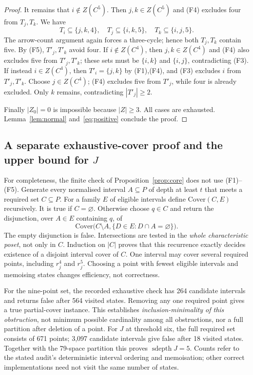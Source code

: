 \documentclass[11pt,a4paper]{article}
\theoremstyle{remark}\newtheorem{remark}[theorem]{Remark}
\DeclareMathOperator{\sdepth}{sdepth}
\begin{document}
\begin{proof}
It remains that $i\notin Z(C^5)$. Then $j,k\in Z(C^5)$ and (F4) excludes four from $T_j,T_k$. We have
\[
T_i\subseteq\{j,k,4\},\quad T_j\subseteq\{i,k,5\},\quad T_k\subseteq\{i,j,5\}.
\]
The arrow-count argument again forces a three-cycle; hence both $T_j,T_k$ contain five. By (F5), $T'_j,T'_k$ avoid four. If $i\notin Z(C^4)$, then $j,k\in Z(C^4)$ and (F4) also excludes five from $T'_j,T'_k$; these sets must be $\{i,k\}$ and $\{i,j\}$, contradicting (F3). If instead $i\in Z(C^4)$, then $T'_i=\{j,k\}$ by (F1),(F4), and (F3) excludes $i$ from $T'_j,T'_k$. Choose $j\in Z(C^4)$; (F4) excludes five from $T'_j$, while four is already excluded. Only $k$ remains, contradicting $|T'_j|\ge2$.

Finally $|Z_0|=0$ is impossible because $|Z|\ge3$. All cases are exhausted. Lemma~\ref{lem:normal} and~\eqref{eq:positive} conclude the proof.
\end{proof}

\subsection{A separate exhaustive-cover proof and the upper bound for $J$}
For completeness, the finite check of Proposition~\ref{prop:core} does not use (F1)--(F5). Generate every normalised interval $A\subseteq P$ of depth at least $t$ that meets a required set $C\subseteq P$. For a family $E$ of eligible intervals define $\mathrm{Cover}(C,E)$ recursively. It is true if $C=\varnothing$. Otherwise choose $q\in C$ and return the disjunction, over $A\in E$ containing $q$, of
\begin{equation}\label{eq:recurrence}
\mathrm{Cover}\bigl(C\setminus A,\{D\in E:D\cap A=\varnothing\}\bigr).
\end{equation}
The empty disjunction is false. Intersections are tested in the \emph{whole characteristic poset}, not only in $C$. Induction on $|C|$ proves that this recurrence exactly decides existence of a disjoint interval cover of $C$. One interval may cover several required points, including $r_j^4$ and $r_j^5$. Choosing a point with fewest eligible intervals and memoising states changes efficiency, not correctness.

For the nine-point set, the recorded exhaustive check has 264 candidate intervals and returns false after 564 visited states. Removing any one required point gives a true partial-cover instance. This establishes \emph{inclusion-minimality of this obstruction}, not minimum possible cardinality among all obstructions, nor a full partition after deletion of a point. For $J$ at threshold six, the full required set consists of 671 points; 3,097 candidate intervals give false after 18 visited states. Together with the 79-space partition this proves $\sdepth J=5$. Counts refer to the stated audit's deterministic interval ordering and memoisation; other correct implementations need not visit the same number of states.
\end{document}
